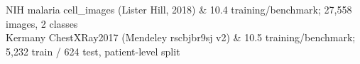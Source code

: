 NIH malaria cell\_images (Lister Hill, 2018) & 10.4 training/benchmark; 27,558 images, 2 classes \\%
Kermany ChestXRay2017 (Mendeley rscbjbr9sj v2) & 10.5 training/benchmark; 5,232 train / 624 test, patient-level split \\%
\hline%
